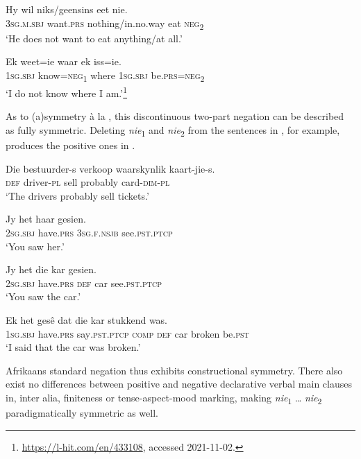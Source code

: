 \documentclass[output=paper,colorlinks,citecolor=brown]{langscibook}
\begin{document}
    \ex\label{ex:afr:4b}
        \gll Hy wil niks/geensins eet nie. \\
             3\textsc{sg.m.sbj} want\textsc{.prs} nothing/in.no.way eat \textsc{neg}\textsubscript{2}\\
        \glt ‘He does not want to eat anything/at all.’

    \ex\label{ex:afr:4c}
        \gll Ek weet=ie waar ek iss=ie. \\
             \textsc{1sg.sbj} know=\textsc{neg}\textsubscript{1} where  \textsc{1sg.sbj} be.\textsc{prs=neg}\textsubscript{2}\\
        \glt ‘I do not know where I am.’\footnote{\href{https://l-hit.com/en/433108}{https://l-hit.com/en/433108}, accessed 2021-11-02.}
    
    \z
\z 


As to (a)symmetry à la \citet{Miestamo2005}, this discontinuous two-part negation can be described as fully symmetric. Deleting \textit{nie}\textsubscript{1} and \textit{nie}\textsubscript{2} from the sentences in , for example, produces the positive ones in .

\ea\label{ex:afr:5}
    \ea\label{ex:afr:5a}
        \gll Die bestuurder-s verkoop waarskynlik kaart-jie-s. \\ 
             \textsc{def} driver-\textsc{pl} sell probably card-\textsc{dim-pl} \\
        \glt ‘The drivers probably sell tickets.’
    
    \ex\label{ex:afr:5b}
        \gll Jy het haar gesien. \\
             \textsc{2sg.sbj} have.\textsc{prs} \textsc{3sg.f.nsjb} see.\textsc{pst.ptcp}\\
        \glt ‘You saw her.’

    \ex\label{ex:afr:5c}
        \gll Jy het die kar gesien. \\ 
             2\textsc{sg.sbj} have.\textsc{prs} \textsc{def} car see\textsc{.pst.ptcp} \\
        \glt ‘You saw the car.’
    
    \ex\label{ex:afr:5d}
        \gll Ek het gesê dat die kar stukkend was. \\
             \textsc{1sg.sbj} have.\textsc{prs} say\textsc{.pst.ptcp} \textsc{comp} \textsc{def} car broken be.\textsc{pst}\\
        \glt ‘I said that the car was broken.’
    \z
\z 

Afrikaans standard negation thus exhibits constructional symmetry. There also exist no differences between positive and negative declarative verbal main clauses in, inter alia, finiteness or tense-aspect-mood marking, making \textit{nie}\textsubscript{1} … \textit{nie}\textsubscript{2} paradigmatically symmetric as well.
\end{document}
